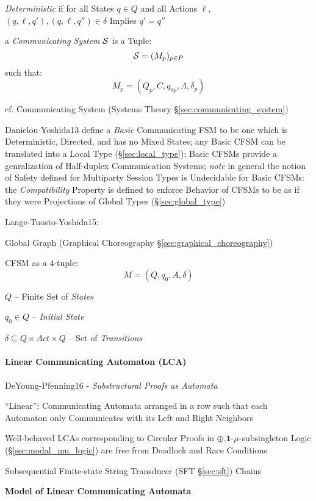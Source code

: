 \emph{Deterministic} if for all States $q \in Q$ and all Actions
$\ell$, $(q,\ell,q'),(q,\ell,q'') \in \delta$ Implies $q' = q''$

a \emph{Communicating System} $\mathcal{S}$ is a Tuple:
\[
  \mathcal{S} = (M_p)_{p \in P}
\]
such that:
\[
  M_p = (Q_p, C, q_{0p}, \Lambda, \delta_p)
\]

\fist cf. Communicating System (Systems Theory
\S\ref{sec:communicating_system}) %

Danielou-Yoshida13 define a \emph{Basic} Communicating FSM to be one
which is Deterministic, Directed, and has no Mixed States; any Basic
CFSM can be translated into a Local Type (\S\ref{sec:local_type});
Basic CFSMs provide a genralization of Half-duplex Communication
Systems; \emph{note} in general the notion of Safety defined for
Multiparty Session Types is Undecidable for Basic CFSMs: the
\emph{Compatibility} Property is defined to enforce Behavior of CFSMs
to be as if they were Projections of Global Types
(\S\ref{sec:global_type})


Lange-Tuosto-Yoshida15:

Global Graph (Graphical Choreography \S\ref{sec:graphical_choreography})

CFSM as a $4$-tuple:
\[
  M = (Q, q_0, A, \delta)
\]

$Q$ -- Finite Set of \emph{States}

$q_0 \in Q$ -- \emph{Initial State}

$\delta \subseteq Q \times Act \times Q$ -- Set of \emph{Transitions}



\paragraph{Linear Communicating Automaton (LCA)}\label{sec:lca} \hfill

DeYoung-Pfenning16 - \emph{Substructural Proofs as Automata}

``Linear'': Communicating Automata arranged in a row such that each
Automaton only Communicates with its Left and Right Neighbors

Well-behaved LCAs corresponding to Circular Proofs in
$\oplus$,$\mathbf{1}$-$\mu$-subsingleton Logic
(\S\ref{sec:modal_mu_logic}) are free from Deadlock and Race
Conditions

Subsequential Finite-state String Transducer (SFT \S\ref{sec:sft})
Chains


\textbf{Model of Linear Communicating Automata}

